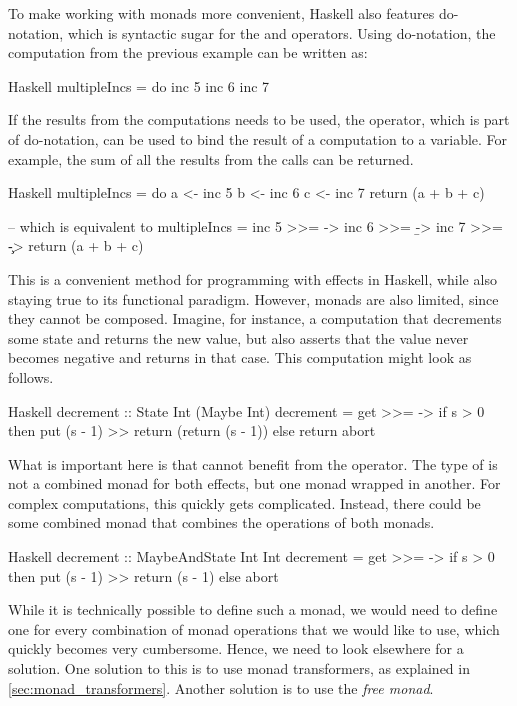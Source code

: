 To make working with monads more convenient, Haskell also features do-notation, which is syntactic sugar for the \hs{>>=} and \hs{>>} operators. Using do-notation, the  computation from the previous example can be written as:

\begin{lst}{Haskell}
multipleIncs = do
  inc 5
  inc 6
  inc 7
\end{lst}
%
If the results from the  computations needs to be used, the \hs{<-} operator, which is part of do-notation, can be used to bind the result of a computation to a variable. For example, the sum of all the results from the  calls can be returned.

\begin{lst}{Haskell}
multipleIncs = do
  a <- inc 5
  b <- inc 6
  c <- inc 7
  return (a + b + c)

-- which is equivalent to
multipleIncs = 
  inc 5 >>= \a ->
    inc 6 >>= \b ->
      inc 7 >>= \c ->
        return (a + b + c)
\end{lst}
%
This is a convenient method for programming with effects in Haskell, while also staying true to its functional paradigm. However, monads are also limited, since they cannot be composed. Imagine, for instance, a computation that decrements some state and returns the new value, but also asserts that the value never becomes negative and returns  in that case. This computation might look as follows.

\begin{lst}{Haskell}
decrement :: State Int (Maybe Int)
decrement = get >>= \s ->
              if s > 0
              then put (s - 1) >> return (return (s - 1))
              else return abort
\end{lst}
%
What is important here is that  cannot benefit from the \hs{>>=} operator. The type of  is not a combined monad for both effects, but one monad wrapped in another. For complex computations, this quickly gets complicated. Instead, there could be some combined monad  that combines the operations of both monads.

\begin{lst}{Haskell}
decrement :: MaybeAndState Int Int
decrement = get >>= \s ->
              if s > 0
              then put (s - 1) >> return (s - 1)
              else abort
\end{lst}
%
While it is technically possible to define such a monad, we would need to define one for every combination of monad operations that we would like to use, which quickly becomes very cumbersome. Hence, we need to look elsewhere for a solution. One solution to this is to use monad transformers, as explained in \cref{sec:monad_transformers}. Another solution is to use the \emph{free monad}.

